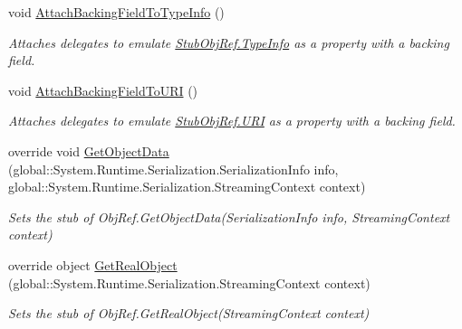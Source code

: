 \begin{DoxyCompactItemize}
void \hyperlink{class_system_1_1_runtime_1_1_remoting_1_1_fakes_1_1_stub_obj_ref_a0b4b2c7fa1a0327f5b24511da3c5cf66}{Attach\-Backing\-Field\-To\-Type\-Info} ()
\begin{DoxyCompactList}\small\item\em Attaches delegates to emulate \hyperlink{class_system_1_1_runtime_1_1_remoting_1_1_fakes_1_1_stub_obj_ref_a1747b0cebd6bd823c163287596cfc99a}{Stub\-Obj\-Ref.\-Type\-Info} as a property with a backing field.\end{DoxyCompactList}\item 
void \hyperlink{class_system_1_1_runtime_1_1_remoting_1_1_fakes_1_1_stub_obj_ref_a7e3f3a01c1ad827f853e9fd7ad3de79e}{Attach\-Backing\-Field\-To\-U\-R\-I} ()
\begin{DoxyCompactList}\small\item\em Attaches delegates to emulate \hyperlink{class_system_1_1_runtime_1_1_remoting_1_1_fakes_1_1_stub_obj_ref_adc7b9cf649921ea894283a334d299c90}{Stub\-Obj\-Ref.\-U\-R\-I} as a property with a backing field.\end{DoxyCompactList}\item 
override void \hyperlink{class_system_1_1_runtime_1_1_remoting_1_1_fakes_1_1_stub_obj_ref_a49da7b34432fbb2fc7329fb26bc2b9dc}{Get\-Object\-Data} (global\-::\-System.\-Runtime.\-Serialization.\-Serialization\-Info info, global\-::\-System.\-Runtime.\-Serialization.\-Streaming\-Context context)
\begin{DoxyCompactList}\small\item\em Sets the stub of Obj\-Ref.\-Get\-Object\-Data(\-Serialization\-Info info, Streaming\-Context context)\end{DoxyCompactList}\item 
override object \hyperlink{class_system_1_1_runtime_1_1_remoting_1_1_fakes_1_1_stub_obj_ref_afb3098bfa0c423dc7d87f2f79fd73ef6}{Get\-Real\-Object} (global\-::\-System.\-Runtime.\-Serialization.\-Streaming\-Context context)
\begin{DoxyCompactList}\small\item\em Sets the stub of Obj\-Ref.\-Get\-Real\-Object(\-Streaming\-Context context)\end{DoxyCompactList}\end{DoxyCompactItemize}
